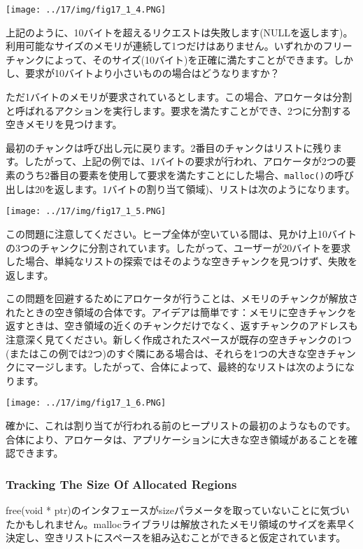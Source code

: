 \texttt{[image: ../17/img/fig17\_1\_4.PNG]}

上記のように、10バイトを超えるリクエストは失敗します(NULLを返します)。利用可能なサイズのメモリが連続して1つだけはありません。いずれかのフリーチャンクによって、そのサイズ(10バイト)を正確に満たすことができます。しかし、要求が10バイトより小さいものの場合はどうなりますか？

ただ1バイトのメモリが要求されているとします。この場合、アロケータは分割と呼ばれるアクションを実行します。要求を満たすことができ、2つに分割する空きメモリを見つけます。

最初のチャンクは呼び出し元に戻ります。2番目のチャンクはリストに残ります。したがって、上記の例では、1バイトの要求が行われ、アロケータが2つの要素のうち2番目の要素を使用して要求を満たすことにした場合、\texttt{malloc()}の呼び出しは20を返します。1バイトの割り当て領域)、リストは次のようになります。

\texttt{[image: ../17/img/fig17\_1\_5.PNG]}

この問題に注意してください。ヒープ全体が空いている間は、見かけ上10バイトの3つのチャンクに分割されています。したがって、ユーザーが20バイトを要求した場合、単純なリストの探索ではそのような空きチャンクを見つけず、失敗を返します。

この問題を回避するためにアロケータが行うことは、メモリのチャンクが解放されたときの空き領域の合体です。アイデアは簡単です：メモリに空きチャンクを返すときは、空き領域の近くのチャンクだけでなく、返すチャンクのアドレスも注意深く見てください。新しく作成されたスペースが既存の空きチャンクの1つ(またはこの例では2つ)のすぐ隣にある場合は、それらを1つの大きな空きチャンクにマージします。したがって、合体によって、最終的なリストは次のようになります。

\texttt{[image: ../17/img/fig17\_1\_6.PNG]}

確かに、これは割り当てが行われる前のヒープリストの最初のようなものです。合体により、アロケータは、アプリケーションに大きな空き領域があることを確認できます。

\hypertarget{tracking-the-size-of-allocated-regions}{%
\subsubsection*{Tracking The Size Of Allocated
Regions}\label{tracking-the-size-of-allocated-regions}}

free(void *
ptr)のインタフェースがsizeパラメータを取っていないことに気づいたかもしれません。mallocライブラリは解放されたメモリ領域のサイズを素早く決定し、空きリストにスペースを組み込むことができると仮定されています。

